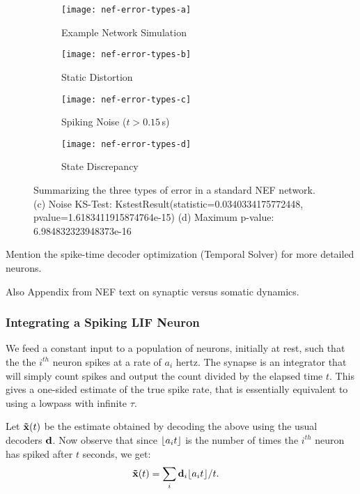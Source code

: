\begin{figure}
  \centering
  \begin{subfigure}{\textwidth}
    \centering
    \texttt{[image: nef-error-types-a]}
    \caption{Example Network Simulation}
    \label{fig:nef-error-types-a}
  \end{subfigure}
  \begin{subfigure}{.33\textwidth}
    \centering
    \texttt{[image: nef-error-types-b]}
    \caption{Static Distortion}
    \label{fig:nef-error-types-b}
  \end{subfigure}%
  \begin{subfigure}{.33\textwidth}
    \centering
    \texttt{[image: nef-error-types-c]}
    \caption{Spiking Noise ($t > 0.15$\,s)}
    \label{fig:nef-error-types-c}
  \end{subfigure}%
  \begin{subfigure}{.33\textwidth}
    \centering
    \texttt{[image: nef-error-types-d]}
    \caption{State Discrepancy}
    \label{fig:nef-error-types-d}
  \end{subfigure}
  \caption{ \label{fig:nef-error-types}
    Summarizing the three types of error in a standard NEF network.
(c) Noise KS-Test: KstestResult(statistic=0.0340334175772448, pvalue=1.6183411915874764e-15)
(d) Maximum p-value: 6.984832323948373e-16
  }
\end{figure}

Mention the spike-time decoder optimization (Temporal Solver) for more detailed neurons.

Also Appendix from NEF text on synaptic versus somatic dynamics.

\subsubsection{Integrating a Spiking LIF Neuron}

We feed a constant input to a population of neurons, initially at rest, such that the the $i^{th}$ neuron spikes at a rate of $a_i$ hertz. The synapse is an integrator that will simply count spikes and output the count divided by the elapsed time $t$. This gives a one-sided estimate of the true spike rate, that is essentially equivalent to using a lowpass with infinite $\tau$.

Let $\mathbf{\tilde{x}}(t)$ be the estimate obtained by decoding the above using the usual decoders $\mathbf{d}$. Now observe that since $\lfloor {a_i t} \rfloor$ is the number of times the $i^{th}$ neuron has spiked after $t$ seconds, we get:
\begin{align*}
\mathbf{\tilde{x}}(t) &= \sum_i \mathbf{d}_i \lfloor {a_i t} \rfloor / t .
\end{align*}

